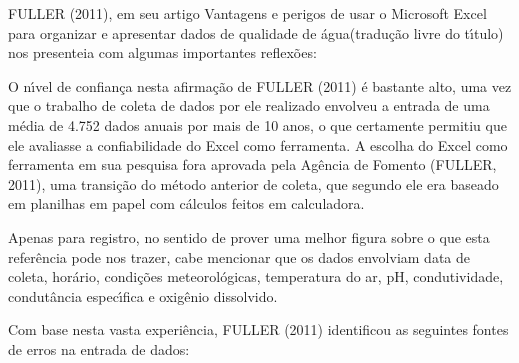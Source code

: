 \documentclass[
12pt,		%
openright,	%
twoside,  %
a4paper,			%
chapter=TITLE,		%
english,			%
french,				%
spanish,			%
brazil				%
]{USPSC-classe/USPSC}
\begin{document}
FULLER (2011), em seu artigo \textquotedbl Vantagens e perigos de usar o Microsoft Excel para organizar e apresentar dados de qualidade de \'agua\textquotedbl  (tradu\c{c}\~ao livre do t\'{\i}tulo) nos presenteia com algumas importantes reflex\~oes:










\noindent\begin{center}\mbox{\centering{}}\end{center}


O n\'{\i}vel de confian\c{c}a nesta afirma\c{c}\~ao de  FULLER (2011) \'e bastante alto, uma vez que o trabalho de coleta de dados por ele realizado envolveu a entrada de uma m\'edia de 4.752 dados anuais por mais de 10 anos, o que certamente permitiu que ele avaliasse a confiabilidade do Excel como ferramenta. A escolha do Excel como ferramenta em sua pesquisa fora aprovada pela Ag\^encia de Fomento  (FULLER, 2011), uma transi\c{c}\~ao do m\'etodo anterior de coleta, que segundo ele era baseado em planilhas em papel com c\'alculos feitos em calculadora.









Apenas para registro, no sentido de prover uma melhor figura sobre o que esta refer\^encia pode nos trazer, cabe mencionar que os dados envolviam data de coleta, hor\'ario, condi\c{c}\~oes meteorol\'ogicas, temperatura do ar, pH, condutividade, condut\^ancia espec\'{\i}fica e oxig\^enio dissolvido.









Com base nesta vasta experi\^encia,  FULLER (2011) identificou as seguintes fontes de erros na entrada de dados:
\end{document}
